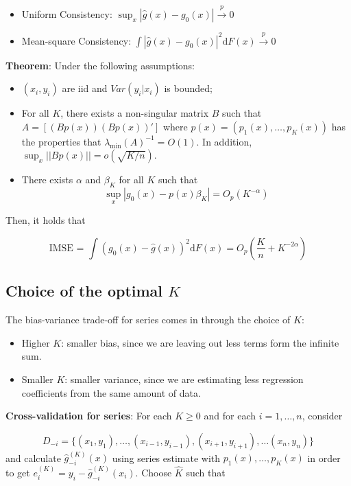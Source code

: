 \documentclass[12pt,]{book}
\providecommand{\tightlist}{%
  \setlength{\itemsep}{0pt}\setlength{\parskip}{0pt}}
\begin{document}
\begin{itemize}
\tightlist
\item
  Uniform Consistency: \(\sup_x | \hat{g}(x) - g_0(x)| \overset{p}{\to} 0\)
\item
  Mean-square Consistency: \(\int | \hat{g}(x) - g_0(x)|^2 \mathrm{d} F(x) \overset{p}{\to} 0\)
\end{itemize}

\textbf{Theorem}:
Under the following assumptions:

\begin{itemize}
\tightlist
\item
  \((x_i, y_i)\) are iid and \(Var(y_i|x_i)\) is bounded;
\item
  For all \(K\), there exists a non-singular matrix \(B\) such that \(A = \left[ (B p(x)) (B p(x))' \right]\) where \(p(x) = \left( p_1(x), \dots, p_K (x) \right)\) has the properties that \(\lambda_{\min} (A)^{-1} = O(1)\). In addition, \(\sup_x | | B p(x) | | = o(\sqrt{K/n})\).
\item
  There exists \(\alpha\) and \(\beta_K\) for all \(K\) such that
  \[
    \sup_x | g_0 (x) - p(x) \beta_K | = O_p(K^{-\alpha})
  \]
\end{itemize}

Then, it holds that

\[
  \text{IMSE = }\int \left( g_0 (x) - \hat{g} (x) \right)^2 \mathrm{d} F(x) = O_p \left( \frac{K}{n} + K^{-2\alpha}\right)
\]

\hypertarget{choice-of-the-optimal-k}{%
\subsection{\texorpdfstring{Choice of the optimal \(K\)}{Choice of the optimal K}}\label{choice-of-the-optimal-k}}

The bias-variance trade-off for series comes in through the choice of \(K\):

\begin{itemize}
\tightlist
\item
  Higher \(K\): smaller bias, since we are leaving out less terms form the infinite sum.
\item
  Smaller \(K\): smaller variance, since we are estimating less regression coefficients from the same amount of data.
\end{itemize}

\textbf{Cross-validation for series}:
For each \(K \geq 0\) and for each \(i=1, \dots, n\), consider

\[
  D_{-i} = \{ (x_1, y_1), \dots, (x_{i-1}, y_{i-1}),(x_{i+1}, y_{i+1}), \dots (x_n, y_n) \}
\]
and calculate \(\hat{g}^{(K)}_{-i} (x)\) using series estimate with \(p_1(x), \dots, p_K (x)\) in order to get \(e^{(K)}_i = y_i - \hat{g}^{(K)}_{-i} (x_i)\). Choose \(\hat{K}\) such that
\end{document}
